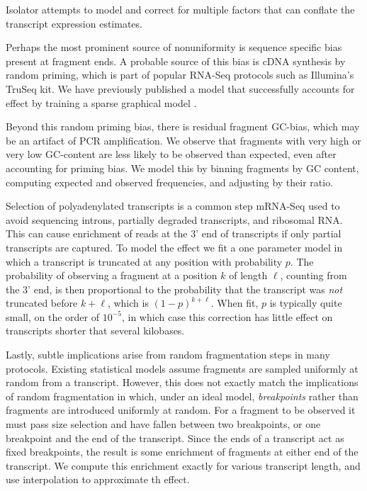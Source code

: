 \documentclass[twocolumn]{article}
\begin{document}
Isolator attempts to model and correct for multiple factors that can
conflate the transcript expression estimates.

Perhaps the most prominent source of nonuniformity is sequence specific
bias present at fragment ends. A probable source of this bias is cDNA
synthesis by random priming, which is part of popular RNA-Seq protocols
such as Illumina's TruSeq kit. We have previously published a model that
successfully accounts for effect by training a sparse graphical model
\cite{Jones:2012hg}.

Beyond this random priming bias, there is residual fragment GC-bias,
which may be an artifact of PCR amplification. We observe that fragments
with very high or very low GC-content are less likely to be observed
than expected, even after accounting for priming bias. We model this by
binning fragments by GC content, computing expected and observed
frequencies, and adjusting by their ratio.

Selection of polyadenylated transcripts is a common step mRNA-Seq used
to avoid sequencing introns, partially degraded transcripts, and
ribosomal RNA. This can cause enrichment of reads at the 3' end of
transcripts if only partial transcripts are captured. To model the
effect we fit a one parameter model in which a transcript is truncated
at any position with probability $p$. The probability of observing a
fragment at a position $k$ of length $\ell$, counting from the 3' end,
is then proportional to the probability that the transcript was
\emph{not} truncated before $k + \ell$, which is $(1-p)^{k + \ell}$.
When fit, $p$ is typically quite small, on the order of $10^{-5}$, in
which case this correction has little effect on transcripts shorter that
several kilobases.

Lastly, subtle implications arise from random fragmentation steps in many
protocols. Existing statistical models assume fragments are sampled uniformly
at random from a transcript. However, this does not exactly match the
implications of random fragmentation in which, under an ideal model,
\emph{breakpoints} rather than fragments are introduced uniformly at random. For
a fragment to be observed it must pass size selection and have fallen between
two breakpoints, or one breakpoint and the end of the transcript. Since the ends
of a transcript act as fixed breakpoints, the result is some enrichment of
fragments at either end of the transcript. We compute this enrichment exactly
for various transcript length, and use interpolation to approximate th effect.



\end{document}
